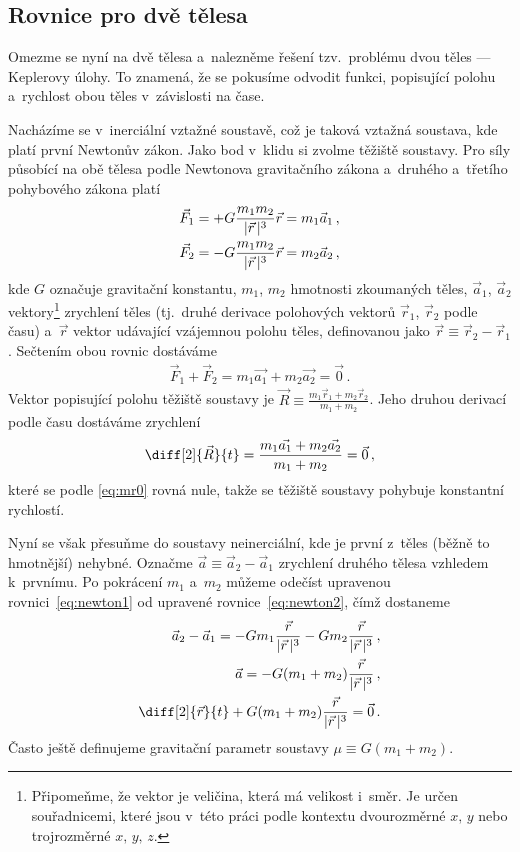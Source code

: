 \documentclass[A4paper, 12pt, oneside, openany]{book}
\begin{document}
\subsection{Rovnice pro dvě tělesa} \label{sec:2body}
Omezme se nyní na dvě tělesa a~nalezněme řešení tzv.\ problému dvou těles --- Keplerovy úlohy. To znamená, že se pokusíme odvodit funkci, popisující polohu a~rychlost obou těles v~závislosti na čase. 

Nacházíme se v~inerciální vztažné soustavě, což je taková vztažná soustava, kde platí první Newtonův zákon. Jako bod v~klidu si zvolme těžiště soustavy. Pro síly působící na obě tělesa podle Newtonova gravitačního zákona a~druhého a~třetího pohybového zákona platí
\begin{align} 
	\vec{F}_1 &= +G\frac{m_1m_2}{\lvert \vec{r} \,\rvert^3}\vec{r} = m_1\vec{a}_1\,, \label{eq:newton1} \\
	\vec{F}_2 &= -G\frac{m_1m_2}{\lvert \vec{r} \,\rvert^3}\vec{r} = m_2\vec{a}_2\,, \label{eq:newton2}
\end{align}
kde $G$ označuje gravitační konstantu, $m_1$, $m_2$ hmotnosti zkoumaných těles, $\vec{a}_1$, $\vec{a}_2$ vektory\footnote{Připomeňme, že vektor je veličina, která má velikost i~směr. Je určen souřadnicemi, které jsou v~této práci podle kontextu dvourozměrné $x,\,y$ nebo trojrozměrné $x,\,y,\,z$.}  zrychlení těles (tj.\ druhé derivace polohových vektorů $\vec{r}_1$, $\vec{r}_2$ podle času) a~$\vec{r}$ vektor udávající vzájemnou polohu těles, definovanou jako $\vec{r} \equiv \vec{r}_2 - \vec{r}_1$. Sečtením obou rovnic dostáváme
\begin{align} \label{eq:mr0}
	\vec{F}_1 + \vec{F}_2 = m_1\vec{a_1} + m_2\vec{a_2} = \vec{0}\,.
\end{align}
Vektor popisující polohu těžiště soustavy je $\vec{R} \equiv \frac{m_1\vec{r}_1 + m_2\vec{r}_2}{m_1 + m_2}$. Jeho druhou derivací podle času dostáváme zrychlení
\begin{align}
	\diff[2]{\vec{R}}{t} = \frac{m_1\vec{a_1} + m_2\vec{a_2}}{m_1+m_2} = \vec{0}\,,
\end{align}
které se podle \eqref{eq:mr0} rovná nule, takže se těžiště soustavy pohybuje konstantní rychlostí.

Nyní se však přesuňme do soustavy neinerciální, kde je první z~těles (běžně to hmotnější) nehybné. Označme $\vec{a}\equiv\vec{a}_2-\vec{a}_1$ zrychlení druhého tělesa vzhledem k~prvnímu. Po pokrácení $m_1$ a~$m_2$ můžeme odečíst upravenou rovnici~\eqref{eq:newton1} od upravené rovnice~\eqref{eq:newton2}, čímž dostaneme
\begin{align}
	\nonumber \vec{a}_2 - \vec{a}_1 = -Gm_1\frac{\vec{r}}{\abs{\vec{r}}^3}-Gm_2\frac{\vec{r}}{\abs{\vec{r}}^3}\,, \\
	\nonumber \vec{a} = -G(m_1+m_2)\frac{\vec{r}}{\abs{\vec{r}}^3}\,, \\
		\diff[2]{\vec{r}}{t} + G(m_1+m_2)\frac{\vec{r}}{\abs{\vec{r}}^3} = \vec{0}\,. \label{eq:eqmotion}
\end{align}
Často ještě definujeme gravitační parametr soustavy $\mu\equiv G(m_1+m_2)$.
\end{document}

